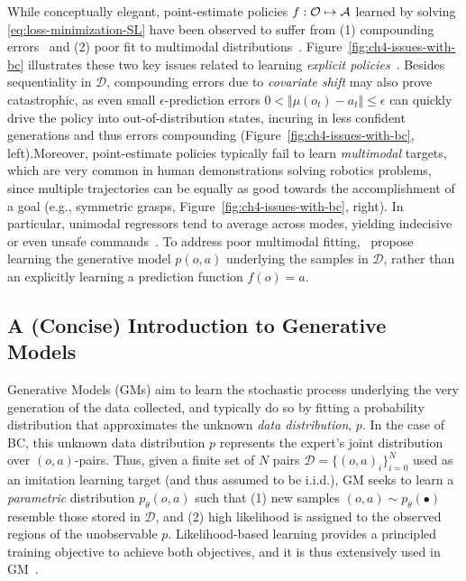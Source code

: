 While conceptually elegant, point-estimate policies \( f : \mathcal O \mapsto \mathcal A \) learned by solving \ref{eq:loss-minimization-SL} have been observed to suffer from (1) compounding errors~\citep{rossReductionImitationLearning2011} and (2) poor fit to multimodal distributions~\citep{florenceImplicitBehavioralCloning2022, keGraspingChopsticksCombating2020}.
Figure~\ref{fig:ch4-issues-with-bc} illustrates these two key issues related to learning \emph{explicit policies}~\citep{florenceImplicitBehavioralCloning2022}.
Besides sequentiality in \( \mathcal D \), compounding errors due to \emph{covariate shift} may also prove catastrophic, as even small \( \epsilon \)-prediction errors \( 0 < \Vert \mu(o_t) - a_t \Vert \leq \epsilon \) can quickly drive the policy into out-of-distribution states, incuring in less confident generations and thus errors compounding (Figure~\ref{fig:ch4-issues-with-bc}, left).Moreover, point-estimate policies typically fail to learn \emph{multimodal} targets, which are very common in human demonstrations solving robotics problems, since multiple trajectories can be equally as good towards the accomplishment of a goal (e.g., symmetric grasps, Figure~\ref{fig:ch4-issues-with-bc}, right).
In particular, unimodal regressors tend to average across modes, yielding indecisive or even unsafe commands~\citep{florenceImplicitBehavioralCloning2022}.
To address poor multimodal fitting,~\citet{florenceImplicitBehavioralCloning2022} propose learning the generative model \( p(o, a) \) underlying the samples in \( \mathcal D \), rather than an explicitly learning a prediction function \( f(o) = a \).

\subsection{A (Concise) Introduction to Generative Models}
Generative Models (GMs) aim to learn the stochastic process underlying the very generation of the data collected, and typically do so by fitting a probability distribution that approximates the unknown \emph{data distribution}, \( p \).
In the case of BC, this unknown data distribution \( p \) represents the expert's joint distribution over \( (o, a) \)-pairs.
Thus, given a finite set of \( N \) pairs \(\mathcal D = \{ (o,a)_i \}_{i=0}^N\) used as an imitation learning target (and thus assumed to be i.i.d.), GM seeks to learn a \emph{parametric} distribution \( p_\theta(o,a) \) such that (1) new samples \( (o,a) \sim p_\theta(\bullet) \) resemble those stored in \( \mathcal D \), and (2) high likelihood is assigned to the observed regions of the unobservable \( p \).
Likelihood-based learning provides a principled training objective to achieve both objectives, and it is thus extensively used in GM~\citep{prince2023understanding}.

